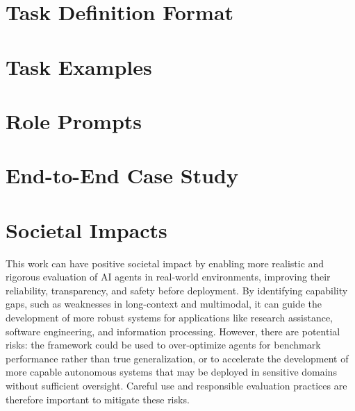 
\providecommand{\appendixDir}{Sections/appendix}

\makeatletter
{}
\makeatother


\section{Task Definition Format}\label{app:format}


\section{Task Examples}\label{app:examples}


\section{Role Prompts}\label{app:prompts}


\section{End-to-End Case Study}\label{app:case-study}


\section{Societal Impacts}
This work can have positive societal impact by enabling more realistic and rigorous evaluation of AI agents in real-world environments, improving their reliability, transparency, and safety before deployment. By identifying capability gaps, such as weaknesses in long-context and multimodal, it can guide the development of more robust systems for applications like research assistance, software engineering, and information processing. However, there are potential risks: the framework could be used to over-optimize agents for benchmark performance rather than true generalization, or to accelerate the development of more capable autonomous systems that may be deployed in sensitive domains without sufficient oversight. Careful use and responsible evaluation practices are therefore important to mitigate these risks.

